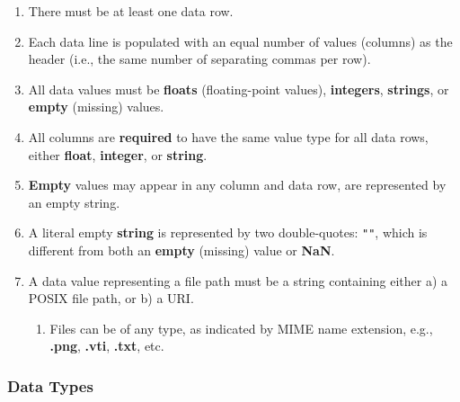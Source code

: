 \begin{enumerate}
\begin{enumerate}
    \item There must be at least one data row.
    \item Each data line is populated with an equal number of values
          (columns) as the header (i.e., the same number of separating commas
          per row).
    \item All data values must be \textbf{floats} (floating-point values),
          \textbf{integers}, \textbf{strings}, or \textbf{empty} (missing)
          values.
    \item All columns are \textbf{required} to have the same value type for
          all data rows, either \textbf{float}, \textbf{integer}, or
          \textbf{string}.
    \item \textbf{Empty} values may appear in any column and data row, are represented by an empty string.
    \item A literal empty \textbf{string} is represented by two double-quotes:
          \texttt{""}, which is different from both an \textbf{empty} (missing)
          value or \textbf{NaN}.
    \item A data value representing a file path must be a string containing either
          a) a POSIX file path, or b) a URI.
    \begin{enumerate}
    \item Files can be of any type, as indicated by MIME name extension, e.g.,
          \textbf{.png}, \textbf{.vti}, \textbf{.txt}, etc.
    \end{enumerate}
\end{enumerate}
\end{enumerate}

\subsubsection{Data Types}

